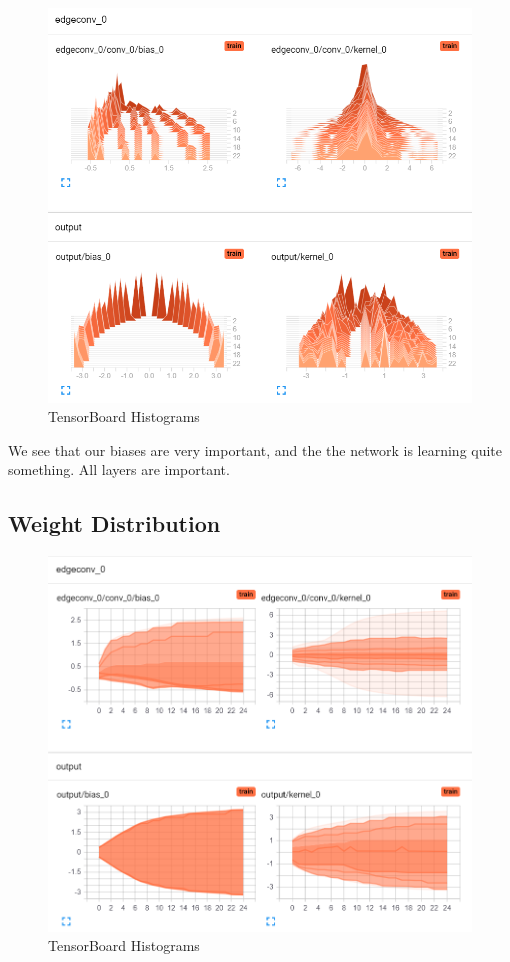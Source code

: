 \begin{figure}[H]
    \centering
    \includegraphics[width=0.8\linewidth]{img/simplify-particle-net/histograms.png}
    \caption{TensorBoard Histograms}
\end{figure}

We see that our biases are very important, and the the network is learning quite something. All layers are important.

\subsection{Weight Distribution}

\begin{figure}[H]
    \centering
    \includegraphics[width=0.8\linewidth]{img/simplify-particle-net/distributions.png}
    \caption{TensorBoard Histograms}
\end{figure}


